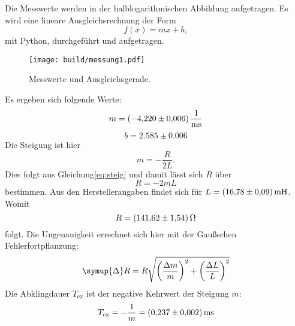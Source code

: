 \noindent Die Messwerte werden in der halblogarithmischen Abbildung aufgetragen.
Es wird eine lineare Ausgleichsrechnung der Form
\begin{equation*}
  f(x)=mx+b,
\end{equation*}
mit Python, durchgeführt und aufgetragen.

\begin{figure}
    \centering
    \texttt{[image: build/messung1.pdf]}
    \caption{Messwerte und Ausgleichsgerade.}
    \label{fig:plot1}
\end{figure}
\noindent Es ergeben sich folgende Werte:
\begin{equation*}
  m=\SI{-4.22\pm0.006}{\per\milli\second}
\end{equation*}
\begin{equation*}
  b=2.585\pm0.006
\end{equation*}
Die Steigung ist hier
\begin{equation*}
  m=-\frac{R}{2L}.
\end{equation*}
Dies folgt aus Gleichung\eqref{eq:steig} und damit lässt sich $R$ über
\begin{equation*}
  R=-2mL
\end{equation*}
bestimmen.
Aus den Herstellerangaben findet sich für $L=\SI{16.78\pm0.09}{\milli\henry}$.
Womit
\begin{equation*}
  R=\SI{141.62\pm1.54}{\ohm}
\end{equation*}
folgt.
Die Ungenauigkeit errechnet sich hier mit der Gaußschen Fehlerfortpflanzung:
\begin{equation*}
  \symup{\Delta} R= R\sqrt{\left(\frac{\Delta m}{m}\right)^2 + \left(\frac{\Delta L}{L}\right)^2}
\end{equation*}
Die Abklingdauer $T_\text{ex}$ ist der negative Kehrwert der Steigung $m$:
\begin{equation*}
  T_\text{ex}= -\frac{1}{m} = \SI{0.237\pm0.002}{\milli\second}
\end{equation*}


